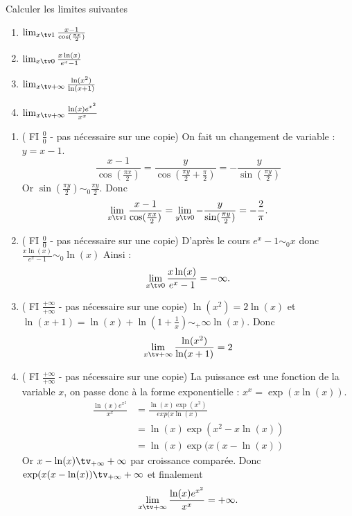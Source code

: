 



\begin{exercice}
Calculer les limites suivantes 
\begin{enumerate}
\item $\lim_{x\tv 1} \frac{x-1}{\cos(\frac{\pi x}{2})}$
\item $\lim_{x\tv 0} \frac{x\ln(x)}{e^x-1}$
\item $\lim_{x\tv +\infty} \frac{\ln(x^2)}{\ln(x+1)}$
\item $\lim_{x\tv +\infty} \frac{\ln(x) e^{x^2}}{x^x}$
\end{enumerate}
\end{exercice}
\begin{correction}
\begin{enumerate}
\item  ( FI $\frac{0}{0}$ - pas nécessaire sur une copie) 
On fait un changement de variable : $y=x-1$.
$$\frac{x-1}{\cos(\frac{\pi x}{2})} = \frac{y}{\cos(\frac{\pi y}{2}+\frac{\pi}{2})}=-\frac{y}{\sin(\frac{\pi y}{2})}$$
Or $\sin(\frac{\pi y}{2})\sim_0 \frac{\pi y}{2}$. Donc 
$$\lim_{x\tv 1} \frac{x-1}{\cos(\frac{\pi x}{2})} = \lim_{y\tv 0} -\frac{y}{\sin(\frac{\pi y}{2})}= -\frac{2}{\pi}.$$
\item  ( FI $\frac{0}{0}$ - pas nécessaire sur une copie) 
D'après le cours $e^x-1\sim_0 x$ donc $ \frac{x\ln(x)}{e^x-1} \sim_0 \ln(x)$
Ainsi : $$\lim_{x\tv 0} \frac{x\ln(x)}{e^x-1}=-\infty.$$
\item  ( FI $\frac{+\infty}{+\infty}$ - pas nécessaire sur une copie) 
$\ln(x^2)= 2\ln(x)$ et  $\ln(x+1) = \ln(x) + \ln\left( 1+\frac{1}{x}\right)\sim_+\infty \ln(x)$. Donc 
$$\lim_{x\tv +\infty} \frac{\ln(x^2)}{\ln(x+1)}=2$$
\item  ( FI $\frac{+\infty}{+\infty}$ - pas nécessaire sur une copie) 
La puissance est une fonction de la variable $x$, on passe donc à la forme exponentielle : $x^x =\exp(x\ln(x))$.
\begin{align*}
\frac{\ln(x) e^{x^2}}{x^x }&= \frac{\ln(x) \exp(x^2)}{exp(x\ln(x)} \\
&= \ln(x) \exp(x^2-x\ln(x))\\ 
&=\ln(x) \exp(x(x-\ln(x))
\end{align*}
Or $x-\ln(x) \tv_{+\infty} +\infty$ par croissance comparée. Donc $\exp(x(x-\ln(x))\tv_{+\infty} +\infty$  et finalement 
$$\lim_{x\tv +\infty} \frac{\ln(x) e^{x^2}}{x^x} =+\infty.$$

\end{enumerate}

\end{correction}